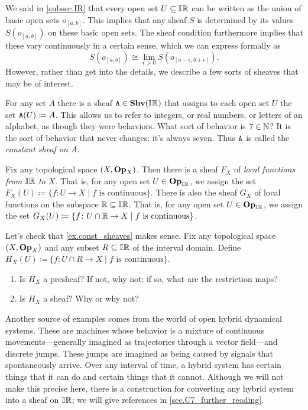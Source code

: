 \documentclass[7Sketches]{subfiles}
\begin{document}
We said in \cref{subsec.IR} that every open set $U\subseteq\mathbb{I}\hspace{.6pt}\mathbb{R}$ can be written as the union of basic open sets $o_{[a,b]}$. This implies that any sheaf $S$ is determined by its values $S(o_{[a,b]})$ on these basic open sets. The sheaf condition furthermore implies that these vary continuously in a certain sense, which we can express formally as
\[S(o_{[a,b]})\cong\lim_{\epsilon>0}S(o_{[a-\epsilon,b+\epsilon]}).\]
However, rather than get into the details, we describe a few sorts of sheaves that may be of interest.

\begin{example}%
\label{ex.const_sheaves}%
For any set $A$ there is a sheaf $\mathtt{A}\in\mathbf{Shv}(\mathbb{I}\hspace{.6pt}\mathbb{R})$ that assigns to each open set $U$ the set $\mathtt{A}(U)\coloneqq A$. This allows us to refer to integers, or real numbers, or letters of an alphabet, as though they were behaviors. What sort of behavior is $7\in\mathbb{N}$? It is the sort of behavior that never changes: it's always seven. Thus $\mathtt{A}$ is called the \emph{constant sheaf on $A$}.
\end{example}

\begin{example}%
Fix any topological space $(X,\mathbf{Op}_X)$. Then there is a sheaf $F_X$ of \emph{local functions from $\mathbb{I}\hspace{.6pt}\mathbb{R}$ to $X$}. That is, for any open set $U\in\mathbf{Op}_{\mathbb{I}\hspace{.6pt}\mathbb{R}}$, we assign the set $F_X(U)\coloneqq\{f\colon U\to X\mid f\text{ is continuous}\}$. There is also the sheaf $G_X$ of local functions on the subspace $\mathbb{R}\subseteq\mathbb{I}\hspace{.6pt}\mathbb{R}$. That is, for any open set $U\in\mathbf{Op}_{\mathbb{I}\hspace{.6pt}\mathbb{R}}$, we assign the set $G_X(U)\coloneqq\{f\colon U\cap\mathbb{R}\to X\mid f\text{ is continuous}\}$. 
\end{example}

\begin{exercise}%
\label{exc.interval_domain_top}
Let's check that \cref{ex.const_sheaves} makes sense. Fix any topological space $(X,\mathbf{Op}_X)$ and any subset $R\subseteq\mathbb{I}\hspace{.6pt}\mathbb{R}$ of the interval domain. Define $H_X(U)\coloneqq\{f\colon U\cap R\to X\mid f\text{ is continuous}\}$.
\begin{enumerate}
	\item Is $H_X$ a presheaf? If not, why not; if so, what are the restriction maps?
	\item Is $H_X$ a sheaf? Why or why not?
	\qedhere
\qedhere
\end{enumerate}
\end{exercise}


\begin{example}
Another source of examples comes from the world of open hybrid dynamical systems. These are machines whose behavior is a mixture of continuous movements---generally imagined as trajectories through a vector field---and discrete jumps. These jumps are imagined as being caused by signals that spontaneously arrive. Over any interval of time, a hybrid system has certain things that it can do and certain things that it cannot. Although we will not make this precise here, there is a construction for converting any hybrid system into a sheaf on $\mathbb{I}\hspace{.6pt}\mathbb{R}$; we will give references in \cref{sec.C7_further_reading}.%
\end{example}
\end{document}
